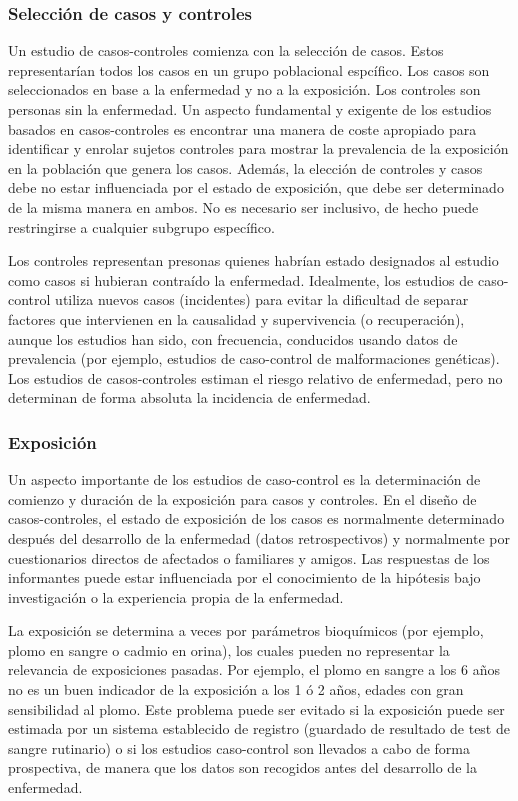 \subsubsection{Selección de casos y controles}
Un estudio de casos-controles comienza con la selección de casos. Estos representarían todos los casos en un grupo poblacional espcífico. Los casos son seleccionados en base a la enfermedad y no a la exposición. Los controles son personas sin la enfermedad. Un aspecto fundamental y exigente de los estudios basados en casos-controles es encontrar una manera de coste apropiado para identificar y enrolar sujetos controles para mostrar la prevalencia de la exposición en la población que genera los casos. Además, la elección de controles y casos debe no estar influenciada por el estado de exposición, que debe ser determinado de la misma manera en ambos. No es necesario ser inclusivo, de hecho puede restringirse a cualquier subgrupo específico.

Los controles representan presonas quienes habrían estado designados al estudio como casos si hubieran contraído la enfermedad. Idealmente, los estudios de caso-control utiliza nuevos casos (incidentes) para evitar la dificultad de separar factores que intervienen en la causalidad y supervivencia (o recuperación), aunque los estudios han sido, con frecuencia, conducidos usando datos de prevalencia (por ejemplo, estudios de caso-control de malformaciones genéticas). Los estudios de casos-controles estiman el riesgo relativo de enfermedad, pero no determinan de forma absoluta la incidencia de enfermedad.
\subsubsection{Exposición}
Un aspecto importante de los estudios de caso-control es la determinación de comienzo y duración de la exposición para casos y controles. En el diseño de casos-controles, el estado de exposición de los casos es normalmente determinado después del desarrollo de la enfermedad (datos retrospectivos) y normalmente por cuestionarios directos de afectados o familiares y amigos. Las respuestas de los informantes puede estar influenciada por el conocimiento de la hipótesis bajo investigación o la experiencia propia de la enfermedad.

La exposición se determina a veces por parámetros bioquímicos (por ejemplo, plomo en sangre o cadmio en orina), los cuales pueden no representar la relevancia de exposiciones pasadas. Por ejemplo, el plomo en sangre a los 6 años no es un buen indicador de la exposición a los 1 ó 2 años, edades con gran sensibilidad al plomo. Este problema puede ser evitado si la exposición puede ser estimada por un sistema establecido de registro (guardado de resultado de test de sangre rutinario) o si los estudios caso-control son llevados a cabo de forma prospectiva, de manera que los datos son recogidos antes del desarrollo de la enfermedad.

